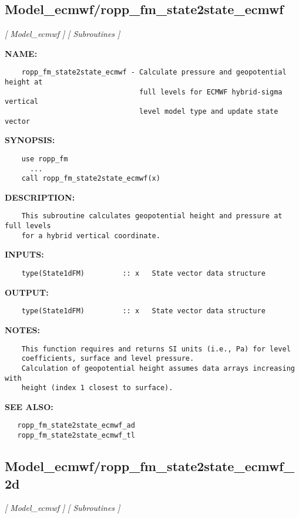 \subsection{Model\_ecmwf/ropp\_fm\_state2state\_ecmwf}
\textsl{[ Model\_ecmwf ]}
\textsl{[ Subroutines ]}

\label{ch:robo57}
\label{ch:Model_ecmwf_ropp_fm_state2state_ecmwf}
\textbf{NAME:}\hspace{0.08in}\begin{Verbatim}
    ropp_fm_state2state_ecmwf - Calculate pressure and geopotential height at 
                                full levels for ECMWF hybrid-sigma vertical 
                                level model type and update state vector
\end{Verbatim}
\textbf{SYNOPSIS:}\hspace{0.08in}\begin{Verbatim}
    use ropp_fm
      ...
    call ropp_fm_state2state_ecmwf(x)
\end{Verbatim}
\textbf{DESCRIPTION:}\hspace{0.08in}\begin{Verbatim}
    This subroutine calculates geopotential height and pressure at full levels
    for a hybrid vertical coordinate.
\end{Verbatim}
\textbf{INPUTS:}\hspace{0.08in}\begin{Verbatim}
    type(State1dFM)         :: x   State vector data structure
\end{Verbatim}
\textbf{OUTPUT:}\hspace{0.08in}\begin{Verbatim}
    type(State1dFM)         :: x   State vector data structure
\end{Verbatim}
\textbf{NOTES:}\hspace{0.08in}\begin{Verbatim}
    This function requires and returns SI units (i.e., Pa) for level 
    coefficients, surface and level pressure.
    Calculation of geopotential height assumes data arrays increasing with 
    height (index 1 closest to surface).
\end{Verbatim}
\textbf{SEE ALSO:}\hspace{0.08in}\begin{Verbatim}
   ropp_fm_state2state_ecmwf_ad
   ropp_fm_state2state_ecmwf_tl
\end{Verbatim}
\subsection{Model\_ecmwf/ropp\_fm\_state2state\_ecmwf\_2d}
\textsl{[ Model\_ecmwf ]}
\textsl{[ Subroutines ]}

